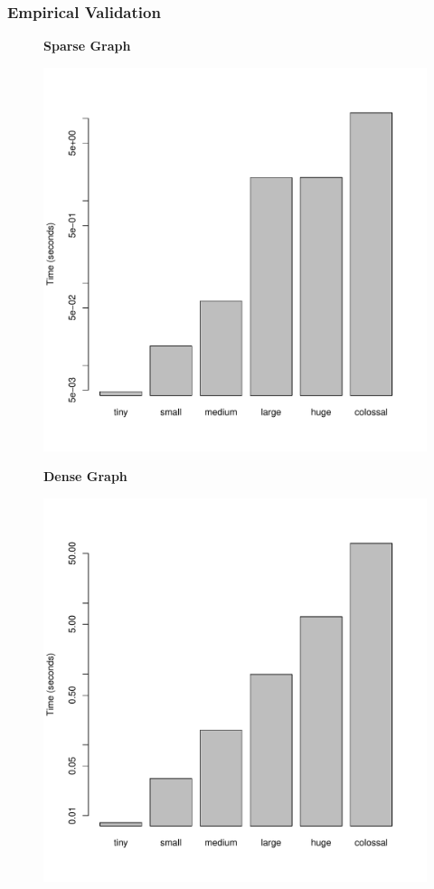 \documentclass[a4paper,12pt]{article}
\begin{document}
\subsubsection{Empirical Validation}
\begin{figure}[h]
  \centering
  \textbf{Sparse Graph}\par\medskip
  \includegraphics[scale=0.3]{Johnson-Min-Heapsparse}
\end{figure}
\begin{figure}[h]
  \centering
  \textbf{Dense Graph}\par\medskip
  \includegraphics[scale=0.3]{Johnson-Min-Heapdense}
\end{figure}
\end{document}
